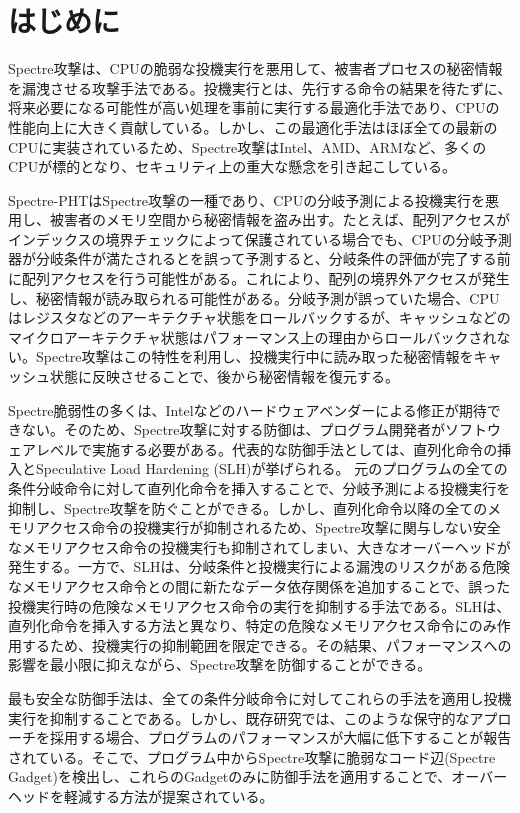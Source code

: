 \section{はじめに}

Spectre攻撃\cite{8835233,Spectre-v4,220586,10.1145/3243734.3243761}は、CPUの脆弱な投機実行を悪用して、被害者プロセスの秘密情報を漏洩させる攻撃手法である。投機実行とは、先行する命令の結果を待たずに、将来必要になる可能性が高い処理を事前に実行する最適化手法であり、CPUの性能向上に大きく貢献している。しかし、この最適化手法はほぼ全ての最新のCPUに実装されているため、Spectre攻撃はIntel、AMD、ARMなど、多くのCPUが標的となり、セキュリティ上の重大な懸念を引き起こしている。

Spectre-PHT\cite{8835233}はSpectre攻撃の一種であり、CPUの分岐予測による投機実行を悪用し、被害者のメモリ空間から秘密情報を盗み出す。たとえば、配列アクセスがインデックスの境界チェックによって保護されている場合でも、CPUの分岐予測器が分岐条件が満たされるとを誤って予測すると、分岐条件の評価が完了する前に配列アクセスを行う可能性がある。これにより、配列の境界外アクセスが発生し、秘密情報が読み取られる可能性がある。分岐予測が誤っていた場合、CPUはレジスタなどのアーキテクチャ状態をロールバックするが、キャッシュなどのマイクロアーキテクチャ状態はパフォーマンス上の理由からロールバックされない。Spectre攻撃はこの特性を利用し、投機実行中に読み取った秘密情報をキャッシュ状態に反映させることで、後から秘密情報を復元する。

Spectre脆弱性の多くは、Intelなどのハードウェアベンダーによる修正が期待できない\cite{intel-security}。そのため、Spectre攻撃に対する防御は、プログラム開発者がソフトウェアレベルで実施する必要がある。代表的な防御手法としては、直列化命令の挿入\cite{oleksenko2020specfuzz}とSpeculative Load Hardening (SLH)\cite{LLVM-SLH}が挙げられる。
元のプログラムの全ての条件分岐命令に対して直列化命令を挿入することで、分岐予測による投機実行を抑制し、Spectre攻撃を防ぐことができる。しかし、直列化命令以降の全てのメモリアクセス命令の投機実行が抑制されるため、Spectre攻撃に関与しない安全なメモリアクセス命令の投機実行も抑制されてしまい、大きなオーバーヘッドが発生する。一方で、SLHは、分岐条件と投機実行による漏洩のリスクがある危険なメモリアクセス命令との間に新たなデータ依存関係を追加することで、誤った投機実行時の危険なメモリアクセス命令の実行を抑制する手法である。SLHは、直列化命令を挿入する方法と異なり、特定の危険なメモリアクセス命令にのみ作用するため、投機実行の抑制範囲を限定できる。その結果、パフォーマンスへの影響を最小限に抑えながら、Spectre攻撃を防御することができる。

最も安全な防御手法は、全ての条件分岐命令に対してこれらの手法を適用し投機実行を抑制することである。しかし、既存研究\cite{wang2018oo7, oleksenko2020specfuzz, LLVM-SLH}では、このような保守的なアプローチを採用する場合、プログラムのパフォーマンスが大幅に低下することが報告されている。そこで、プログラム中からSpectre攻撃に脆弱なコード辺(Spectre Gadget)を検出し、これらのGadgetのみに防御手法を適用することで、オーバーヘッドを軽減する方法が提案されている。

